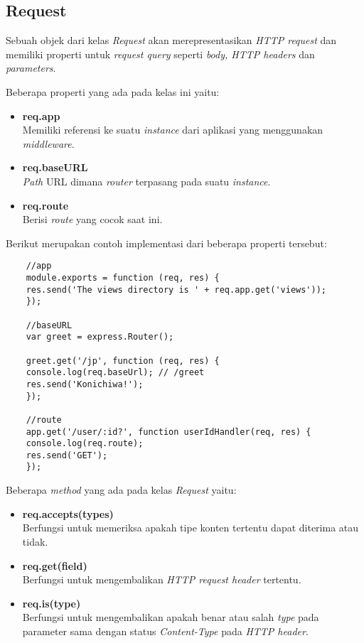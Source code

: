 \subsection{Request}
Sebuah objek dari kelas \textit{Request} akan merepresentasikan \textit{HTTP request} dan memiliki properti untuk \textit{request query} seperti \textit{body, HTTP headers} dan \textit{parameters}.

Beberapa properti yang ada pada kelas ini yaitu:

\begin{itemize}
	\item \textbf{req.app} \\ Memiliki referensi ke suatu \textit{instance} dari aplikasi yang menggunakan \textit{middleware}.
	
	\item \textbf{req.baseURL} \\ \textit{Path} URL dimana \textit{router} terpasang pada suatu \textit{instance}.
	
	\item \textbf{req.route} \\ Berisi \textit{route} yang cocok saat ini.
	
\end{itemize} 

Berikut merupakan contoh implementasi dari beberapa properti tersebut:

\begin{lstlisting}
	//app
	module.exports = function (req, res) {
	res.send('The views directory is ' + req.app.get('views'));
	});
	
	//baseURL
	var greet = express.Router();
	
	greet.get('/jp', function (req, res) {
	console.log(req.baseUrl); // /greet
	res.send('Konichiwa!');
	});
	
	//route
	app.get('/user/:id?', function userIdHandler(req, res) {
	console.log(req.route);
	res.send('GET');
	});
\end{lstlisting}

Beberapa \textit{method} yang ada pada kelas \textit{Request} yaitu: 
\begin{itemize}
	\item \textbf{req.accepts(types)} \\ Berfungsi untuk memeriksa apakah tipe konten tertentu dapat diterima atau tidak.
	
	\item \textbf{req.get(field)} \\ Berfungsi untuk mengembalikan \textit{HTTP request header} tertentu.
	
	\item \textbf{req.is(type)} \\ Berfungsi untuk mengembalikan apakah benar atau salah \textit{type} pada parameter sama dengan status \textit{Content-Type} pada \textit{HTTP header}.
\end{itemize}

